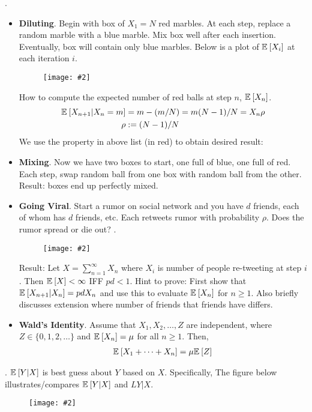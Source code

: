 \documentclass[12pt]{article}
\newcommand\myfig[2][0.3\textwidth]{\begin{figure}[h!]\centering\texttt{[image: \#2]}\end{figure}}
\newcommand{\myspace}{\vspace{2\bigskipamount}}
\newcommand\p{\Needspace{12\baselineskip} \noindent}
\begin{document}
\myspace
\p {}. 
\begin{itemize}
	\item \textbf{Diluting}. Begin with box of $X_1 = N$ red marbles. At each step, replace a random marble with a blue marble. Mix box well after each insertion. Eventually, box will contain only blue marbles. Below is a plot of $\mathbb{E}_{}\left[X_i\right]$ at each iteration $i$. \myfig[0.25\textwidth]{Marbles.PNG}
	
	How to compute the expected number of red balls at step $n$, $\mathbb{E}_{}\left[X_n\right]$. 
	\begin{align}
		\mathbb{E}_{}\left[X_{n + 1} | X_n = m\right] &= m - (m / N) = m (N - 1)/N = X_n \rho \\
		\rho &:= (N - 1)/N
	\end{align}
	We use the property in above list (in red) to obtain desired result:
		
	\item \textbf{Mixing}. Now we have two boxes to start, one full of blue, one full of red. Each step, swap random ball from one box with random ball from the other. Result: boxes end up perfectly mixed.
	
	\item \textbf{Going Viral}. Start a rumor on social network and you have $d$ friends, each of whom has $d$ friends, etc. Each retweets rumor with probability $\rho$. Does the rumor spread or die out? \purple{[37:00]}. \myfig[0.4\textwidth]{Viral.PNG}
	
	Result: Let $X = \sum_{n = 1}^{\infty} X_n$ where $X_i$ is number of people re-tweeting at step $i$. Then $\mathbb{E}_{}\left[X\right] < \infty$ IFF $pd < 1$. Hint to prove: First show that $\mathbb{E}_{}\left[X_{n + 1} | X_n\right] = pdX_n$ and use this to evaluate $\mathbb{E}_{}\left[X_n\right]$ for $n \ge 1$. Also briefly discusses extension where number of friends that friends have differs.
	
	
	\item \textbf{Wald's Identity}. \purple{[46:00]} Assume that $X_1, X_2, \ldots, Z$ are independent, where $Z \in \{0, 1, 2, \ldots\}$ and $\mathbb{E}_{}\left[X_n\right] = \mu$ for all $n \ge 1$. Then,
	\begin{align}
		\mathbb{E}_{}\left[X_1 + \cdots + X_n\right] = \mu \mathbb{E}_{}\left[Z\right]
	\end{align}
\end{itemize}

\myspace
\p {}. $\mathbb{E}_{}\left[Y | X\right]$ is best guess about $Y$ based on $X$. Specifically,
The figure below illustrates/compares $\mathbb{E}_{}\left[Y | X\right]$ and $L{Y | X}$. \myfig[0.5\textwidth]{CE.PNG}
\end{document}

